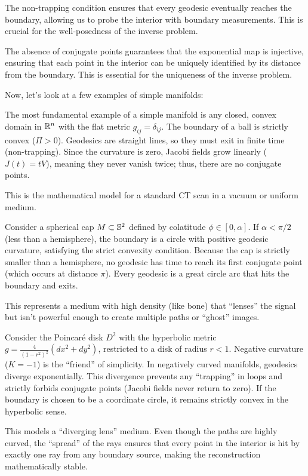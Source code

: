 The non-trapping condition ensures that every geodesic eventually reaches the boundary, allowing us to probe the interior with boundary measurements. This is crucial for the well-posedness of the inverse problem.

The absence of conjugate points guarantees that the exponential map is injective, ensuring that each point in the interior can be uniquely identified by its distance from the boundary. This is essential for the uniqueness of the inverse problem.

Now, let's look at a few examples of simple manifolds:

\begin{example}[[The Euclidean Ball (The Zero Curvature Case)]
  The most fundamental example of a simple manifold is any closed, convex domain in $\R^n$ with the flat metric $g_{ij} = \delta_{ij}$. The boundary of a ball is strictly convex ($\Pi > 0$). Geodesics are straight lines, so they must exit in finite time (non-trapping). Since the curvature is zero, Jacobi fields grow linearly ($J(t) = tV$), meaning they never vanish twice; thus, there are no conjugate points.

  This is the mathematical model for a standard CT scan in a vacuum or uniform medium.
\end{example}

\begin{example}
  Consider a spherical cap $M \subset \S^2$ defined by colatitude $\phi \in [0, \alpha]$. If $\alpha < \pi/2$ (less than a hemisphere), the boundary is a circle with positive geodesic curvature, satisfying the strict convexity condition. Because the cap is strictly smaller than a hemisphere, no geodesic has time to reach its first conjugate point (which occurs at distance $\pi$). Every geodesic is a great circle arc that hits the boundary and exits.

  This represents a medium with high density (like bone) that ``lenses'' the signal but isn't powerful enough to create multiple paths or ``ghost'' images.
\end{example}

\begin{example}
  Consider the Poincar\'e disk $D^2$ with the hyperbolic metric $g = \frac{4}{(1-r^2)^2}(dx^2 + dy^2)$, restricted to a disk of radius $r < 1$. Negative curvature ($K = -1$) is the ``friend'' of simplicity. In negatively curved manifolds, geodesics diverge exponentially. This divergence prevents any ``trapping'' in loops and strictly forbids conjugate points (Jacobi fields never return to zero). If the boundary is chosen to be a coordinate circle, it remains strictly convex in the hyperbolic sense.

  This models a ``diverging lens'' medium. Even though the paths are highly curved, the ``spread'' of the rays ensures that every point in the interior is hit by exactly one ray from any boundary source, making the reconstruction mathematically stable.
\end{example}

